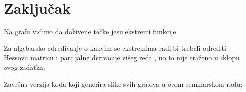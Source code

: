 \chapter{Zaključak}

Na grafu vidimo da dobivene točke jesu ekstremi funkcije. \par
Za algebarsko određivanje o kakvim se ekstremima radi bi trebali odrediti Hessovu matricu i parcijalne derivacije višeg reda \cite[][poglavlje 6.3]{ccalc}, no to nije traženo u sklopu ovog zadatka.

Završna verzija koda koji generira slike svih grafova u ovom seminarskom radu:
\inputminted[breaklines]{python}{./code/graph.py}

\newpage
